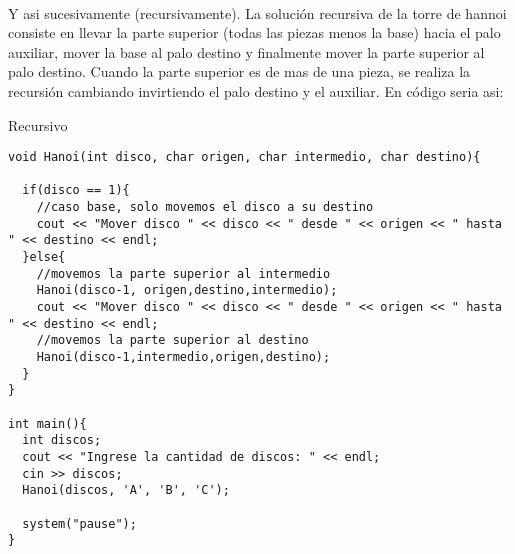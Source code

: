 \\Y asi sucesivamente (recursivamente). La solución recursiva de la torre de hannoi consiste en llevar la parte superior (todas las piezas menos la base) hacia el palo auxiliar, mover la base al palo destino y finalmente mover la parte superior al palo destino. Cuando la parte superior es de mas de una pieza, se realiza la recursión cambiando invirtiendo el palo destino y el auxiliar. En código seria asi:
\begin{minipage}{\textwidth}
Recursivo
\\\begin{lstlisting}[style=C,caption=hannoi.cpp]
void Hanoi(int disco, char origen, char intermedio, char destino){

  if(disco == 1){
    //caso base, solo movemos el disco a su destino
    cout << "Mover disco " << disco << " desde " << origen << " hasta " << destino << endl;
  }else{
    //movemos la parte superior al intermedio
    Hanoi(disco-1, origen,destino,intermedio);
    cout << "Mover disco " << disco << " desde " << origen << " hasta " << destino << endl;
    //movemos la parte superior al destino
    Hanoi(disco-1,intermedio,origen,destino);
  }
}

int main(){
  int discos;
  cout << "Ingrese la cantidad de discos: " << endl;
  cin >> discos;
  Hanoi(discos, 'A', 'B', 'C');

  system("pause");
}
\end{lstlisting}
\end{minipage}
